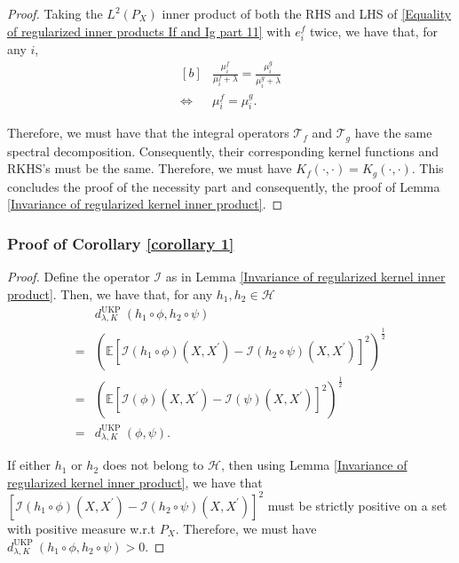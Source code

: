 \documentclass{article}
\theoremstyle{plain}
\newcommand{\E}{\mathbb{E}}
\newcommand{\repone}{\phi}
\newcommand{\reptwo}{\psi}
\newcommand{\LPtwo}{L^{2}(P_{X})}
\newcommand{\metricstname}{UKP }
\begin{document}
\begin{proof}
    Taking the $\LPtwo$ inner product of both the RHS and LHS of \eqref{Equality of regularized inner products If and Ig part 11} with $e_{i}^{f}$ twice, we have that, for any $i$,
    \begin{equation*}
        \begin{aligned}[b]
            &\frac{\mu_{i}^{f}}{\mu_{i}^{f} + \lambda} = \frac{\mu_{i}^{g}}{\mu_{i}^{g} + \lambda}\\
            \iff & \mu_{i}^{f} = \mu_{i}^{g}.
        \end{aligned}
    \end{equation*}

    Therefore, we must have that the integral operators $\mathcal{T}_{f}$ and $\mathcal{T}_{g}$ have the same spectral decomposition. Consequently, their corresponding kernel functions and RKHS's must be the same. Therefore, we must have $ K_{f}(\cdot, \cdot) = K_{g}(\cdot, \cdot)$. This concludes the proof of the necessity part and consequently, the proof of Lemma \ref{Invariance of regularized kernel inner product}.
\end{proof}

\subsubsection{Proof of Corollary \ref{corollary 1}} \label{Proof of Corollary 1}

\begin{proof}
    Define the operator $\mathcal{I}$ as in Lemma \ref{Invariance of regularized kernel inner product}. Then, we have that, for any $h_{1},h_{2} \in \mathcal{H}$
    \[
    \begin{aligned}
        & d_{\lambda,K}^{\text{\metricstname}}(h_{1} \circ \repone,h_{2} \circ \reptwo)\\
        =& \left(\E\left[\mathcal{I}(h_{1} \circ \repone)(X,X^{\prime}) - \mathcal{I}(h_{2} \circ \reptwo)(X,X^{\prime})\right]^{2}\right)^{\frac{1}{2}}\\
        =& \left(\E\left[\mathcal{I}(\repone)(X,X^{\prime}) - \mathcal{I}(\reptwo)(X,X^{\prime})\right]^{2}\right)^{\frac{1}{2}}\\
        =& d_{\lambda,K}^{\text{\metricstname}}(\repone,\reptwo).
    \end{aligned}
    \]

    If either $h_{1}$ or $h_{2}$ does not belong to $\mathcal{H}$, then using Lemma \ref{Invariance of regularized kernel inner product}, we have that $\left[\mathcal{I}(h_{1} \circ \repone)(X,X^{\prime}) - \mathcal{I}(h_{2} \circ \reptwo)(X,X^{\prime})\right]^{2}$ must be strictly positive on a set with positive measure w.r.t $P_{X}$. Therefore, we must have $d_{\lambda,K}^{\text{\metricstname}}(h_{1} \circ \repone,h_{2} \circ \reptwo) > 0$.
\end{proof}
\end{document}
